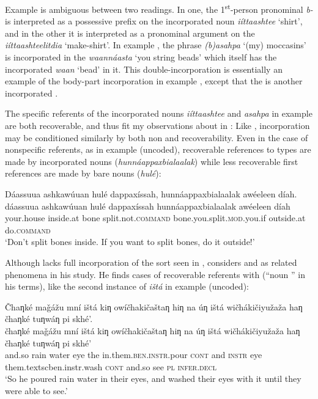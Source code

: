 \documentclass[output=paper]{LSP/langsci}
\begin{document}
Example  is ambiguous between two readings. In one, the 1\textsuperscript{st}-person pronominal \emph{b-} is interpreted as a possessive prefix on the incorporated noun  \emph{iíttaashtee} `shirt', and in the other it is interpreted as a pronominal argument on the  \emph{iíttaashteelitdia} `make-shirt'. In example , the  phrase \emph{(b)asahpa} `(my) moccasins' is incorporated in the  \emph{waannáasta} `you string beads' which itself has the incorporated \emph{waan} `bead' in it. This double-incorporation is essentially an example of the body-part incorporation in example , except that the  is another incorporated .

	The specific referents of the incorporated nouns \emph{iíttaashtee} and \emph{asahpa} in example  are both recoverable, and thus fit my observations about  in : Like , incorporation may be conditioned similarly by both non and recoverability. Even in the case of nonspecific referents, as in example  (uncoded), recoverable references to types are made by incorporated nouns (\emph{‎hunnáappaxbialaalak}) while less recoverable first references are made by bare nouns (\emph{hulé}):
	 
\ea\label{splitbones}
 	Dáassuua ashkawúuan hulé dappaxíssah, hunnáappaxbialaalak awéeleen díah.\footnotemark\\
\gll	dáassuua		ashkawúuan		hulé		dappaxíssah				hunnáappaxbialaalak			awéeleen		díah\\
	your.house		inside.at		bone		split.not.\textsc{command}	bone.you.split.\textsc{mod}.you.if	outside.at		do.\textsc{command}\\
\glt	`Don’t split bones inside. If you want to split bones, do it outside!' 
\z

	Although  lacks full incorporation of the sort seen in , \citet{deReuse1994} considers  and  as related phenomena in his study. He finds cases of recoverable referents with  (“noun ” in his terms), like the second instance of \emph{ištá} in example  (uncoded):
	
\ea\label{lakhotaeye}
 	Čhaƞké maǧážu mní ištá kiƞ owíčhakičaštaƞ hiƞ na úƞ ištá wičhákičiyužaža haƞ čhaƞké tuƞwáƞ pi skhé’.\footnotemark\\
\gll	čhaƞké	maǧážu	mní	ištá	kiƞ	owíčhakičaštaƞ			hiƞ			na	úƞ			ištá		wičhákičiyužaža			haƞ			čhaƞké		tuƞwáƞ	pi		skhé’\\
	and.so	rain		water	eye	the	in.them.\textsc{ben.instr}.pour	\textsc{cont}	and	\textsc{instr}	eye		them.textsc{ben.instr}.wash	\textsc{cont}	and.so	see		\textsc{pl}	\textsc{infer.decl}\\
\glt	`So he poured rain water in their eyes, and washed their eyes with it until they were able to see.'
\z
\end{document}
